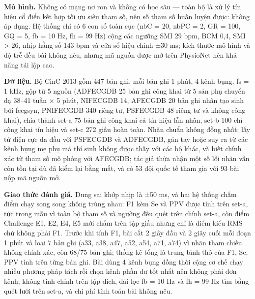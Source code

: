 \documentclass[12pt,a4paper]{article}
\begin{document}
\noindent \textbf{Mô hình.} Không có mạng nơ ron và không có học sâu — toàn bộ là xử lý tín hiệu cổ điển kết hợp tối ưu siêu tham số, nên số tham số huấn luyện được: không áp dụng. Hệ thống chỉ có 6 con số toàn cục (nbC = 20, nbPC = 2, GR = 100, GQ = 5, fb = 10 Hz, fh = 99 Hz) cộng các ngưỡng SMI 29 bpm, BCM 0,4, SMI > 26, nhịp hằng số 143 bpm và cửa sổ hiệu chỉnh ±30 ms; kích thước mô hình và độ trễ đều bài không nêu, nhưng mã nguồn được mở trên PhysioNet nên khả năng tái lập cao.\par\vspace{3pt}
\noindent \textbf{Dữ liệu.} Bộ CinC 2013 gồm 447 bản ghi, mỗi bản ghi 1 phút, 4 kênh bụng, fs = 1 kHz, gộp từ 5 nguồn (ADFECGDB 25 bản ghi công khai từ 5 sản phụ chuyển dạ 38–41 tuần × 5 phút, NIFECGDB 14, AFECGDB 20 bản ghi nhân tạo sinh bởi fecgsyn, PNIFECGDB 340 riêng tư, PSFECGDB 48 riêng tư và không công khai), chia thành set-a 75 bản ghi công khai cả tín hiệu lẫn nhãn, set-b 100 chỉ công khai tín hiệu và set-c 272 giấu hoàn toàn. Nhãn chuẩn không đồng nhất: lấy từ điện cực da đầu với PSFECGDB và ADFECGDB, gán tay hoặc suy ra từ các kênh bụng mẹ phụ mà thí sinh không được thấy với các bộ khác, và biết chính xác từ tham số mô phỏng với AFECGDB; tác giả thừa nhận một số lỗi nhãn vẫn còn tồn tại dù đã kiểm lại bằng mắt, và có 53 đội quốc tế tham gia với 93 bài nộp mã nguồn mở.\par\vspace{3pt}
\noindent \textbf{Giao thức đánh giá.} Dung sai khớp nhịp là ±50 ms, và hai hệ thống chấm điểm chạy song song không trùng nhau: F1 kèm Se và PPV được tính trên set-a, tức trong mẫu vì toàn bộ tham số và ngưỡng đều quét trên chính set-a, còn điểm Challenge E1, E2, E4, E5 mới chấm trên tập giấu nhưng chỉ là điểm kiểu RMS chứ không phải F1. Trước khi tính F1, bài cắt 2 giây đầu và 2 giây cuối mỗi đoạn 1 phút và loại 7 bản ghi (a33, a38, a47, a52, a54, a71, a74) vì nhãn tham chiếu không chính xác, còn 68/75 bản ghi; thống kê tổng là trung bình thô của F1, Se, PPV tính trên từng bản ghi. Bài dùng 4 kênh bụng đồng thời cộng cơ chế chạy nhiều phương pháp tách rồi chọn kênh phần dư tốt nhất nên không phải đơn kênh; không tinh chỉnh trên tập đích, dải lọc fb = 10 Hz và fh = 99 Hz tìm bằng quét lưới trên set-a, và chi phí tính toán bài không nêu.\par\vspace{3pt}
\end{document}
